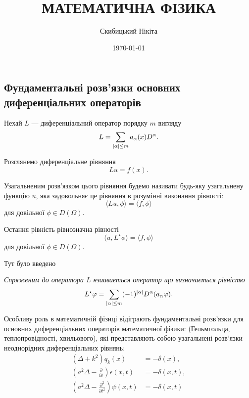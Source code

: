 

\title{{\Huge МАТЕМАТИЧНА ФІЗИКА}}
\author{Скибицький Нікіта}
\date{\today}





\tableofcontents

\setcounter{section}{4}
\setcounter{subsection}{1}
\setcounter{subsubsection}{4}
\setcounter{theorem}{51}
\setcounter{equation}{48}

\subsection{Фундаментальні розв'язки основних диференціальних операторів}

Нехай $L$ --- диференціальний оператор порядку $m$ вигляду
\begin{equation}
	L = \displaystyle\sum\limits_{|\alpha|\le m}a_\alpha(x)D^\alpha.
\end{equation}

Розглянемо диференціальне рівняння
\begin{equation}
	L u = f(x).
\end{equation}

\begin{definition}
	Узагальненим розв'язком цього рівняння будемо називати будь-яку узагальнену функцію $u$, яка задовольняє це рівняння в розумінні виконання рівності:
	\begin{equation}
		\langle L u, \phi \rangle = \langle f, \phi \rangle
	\end{equation}
	для довільної $\phi \in D(\Omega)$.
\end{definition}

Остання рівність рівнозначна рівності
\begin{equation}
	\langle u, L^\star \phi \rangle = \langle f, \phi \rangle
\end{equation}
для довільної $\phi \in D(\Omega)$. \medskip

Тут було введено
\begin{definition}
	\it{Спряженим} до оператора $L$ нзаивається оператор що визначається рівністю
	\begin{equation}
		L^\star \varphi = \displaystyle\sum\limits_{|\alpha|\le m} (-1)^{|\alpha|} D^\alpha (a_\alpha \varphi).
	\end{equation}
\end{definition}

Особливу роль в математичній фізиці відіграють фундаментальні роз\-в'яз\-ки для основних диференціальних операторів математичної фізики: (Гельмгольца, теплопровідності, хвильового), які представляють собою узагальнені розв'язки неоднорідних диференціальних рівнянь:
\begin{align}
	(\Delta + k^2) q_k(x) &= - \delta(x), \\
	\left( a^2 \Delta - \frac{\partial}{\partial t} \right) \epsilon(x, t) &= - \delta(x, t), \\
	\left( a^2 \Delta - \frac{\partial^2}{\partial t^2} \right) \psi(x, t) &= - \delta(x, t)
\end{align}


